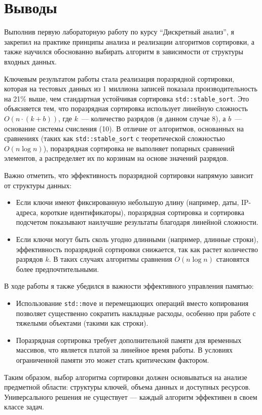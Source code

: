 \section{Выводы}

Выполнив первую лабораторную работу по курсу \enquote{Дискретный анализ}, я закрепил 
на практике принципы анализа и реализации алгоритмов сортировки, а также 
научился обоснованно выбирать алгоритм в зависимости от структуры входных данных.

Ключевым результатом работы стала реализация поразрядной сортировки, 
которая на тестовых данных из 1 миллиона записей показала производительность 
на 21\% выше, чем стандартная устойчивая сортировка \texttt{std::stable\_sort}. 
Это объясняется тем, что поразрядная сортировка использует линейную сложность 
$O(n \cdot (k + b))$, где $k$~--- количество разрядов (в данном случае 8), 
а $b$~--- основание системы счисления (10). В отличие от алгоритмов, основанных 
на сравнениях (таких как \texttt{std::stable\_sort} с теоретической сложностью 
$O(n \log n)$), поразрядная сортировка не выполняет попарных сравнений элементов, 
а распределяет их по корзинам на основе значений разрядов.

Важно отметить, что эффективность поразрядной сортировки напрямую зависит от 
структуры данных:
\begin{itemize}
    \item Если ключи имеют фиксированную небольшую длину (например, даты,
    IP-адреса, короткие идентификаторы), поразрядная сортировка и сортировка
    подсчетом показывают наилучшие результаты благодаря линейной сложности.
    
    \item Если ключи могут быть сколь угодно длинными (например, длинные строки),
    эффективность поразрядной сортировки снижается, так как растет количество
    разрядов $k$. В таких случаях алгоритмы сравнения $O(n \log n)$ становятся
    более предпочтительными.
\end{itemize}

В ходе работы я также убедился в важности эффективного управления памятью:
\begin{itemize}
    \item Использование \texttt{std::move} и перемещающих операций вместо 
    копирования позволяет существенно сократить накладные расходы, особенно 
    при работе с тяжелыми объектами (такими как строки).
    
    \item Поразрядная сортировка требует дополнительной памяти для временных 
    массивов, что является платой за линейное время работы. В условиях 
    ограниченной памяти это может стать критическим фактором.
\end{itemize}

Таким образом, выбор алгоритма сортировки должен основываться на анализе 
предметной области: структуры ключей, объема данных и доступных ресурсов. 
Универсального решения не существует --- каждый алгоритм эффективен в своем 
классе задач.

\pagebreak